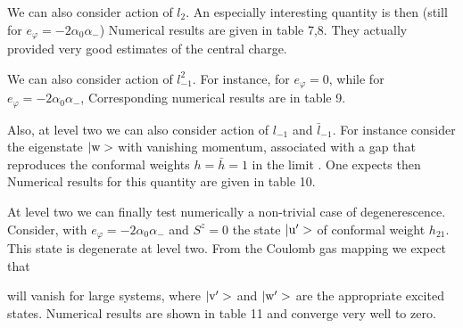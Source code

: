We can also consider action of $l_{2}$. An especially interesting quantity
is then (still for $e_\varphi=-2\alpha_0\alpha_-$)
%
\eqn{}
%
Numerical results are given in table 7,8. They actually provided very
good estimates of the central charge.

We can also consider action of $l_{-1}^2$. For instance,
 for $e_\varphi=0$,
%
\eqn{}
%
while for $e_\varphi=-2\alpha_0\alpha_-$,
%
\eqn{}
%
Corresponding numerical results are in table 9.

Also, at level two we can also consider action of $l_{-1}$ and
 $\bar{l}_{-1}$. For instance consider the eigenstate $|\hbox{w}>$ with
 vanishing momentum, associated with a gap that reproduces the
conformal weights $h=\bar{h}=1$ in the limit \limitone. One
expects then
%
\eqn{}
%
Numerical results for this quantity are given in table 10.

At level two we can finally test numerically a non-trivial case of
degenerescence. Consider, with $e_\varphi=-2\alpha_0\alpha_-$ and
 $S^z=0$ the state $|\hbox{u}'>$ of conformal
weight $h_{21}$.
This state is degenerate
 at level two. From the Coulomb gas mapping we expect that

%
\eqn{}
%
will vanish for large systems, where $|\hbox{v}'>$ and $|\hbox{w}'>$
are the appropriate excited states.
 Numerical results are shown in table 11 and converge very well to zero.






